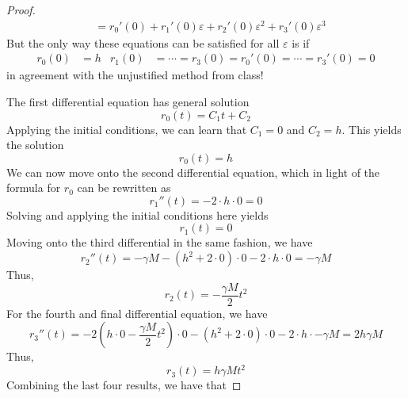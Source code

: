 \documentclass[../notes.tex]{subfiles}
\begin{document}
\begin{enumerate}[label={\textbf{1.\arabic*.}},ref={1.\arabic*},leftmargin=3.5em]
\begin{proof}
\begin{align*}
                &= r_0'(0)+r_1'(0)\varepsilon+r_2'(0)\varepsilon^2+r_3'(0)\varepsilon^3
        \end{align*}
        But the only way these equations can be satisfied for all $\varepsilon$ is if
        \begin{align*}
            r_0(0) &= h&
            r_1(0) &= \cdots = r_3(0) = r_0'(0) = \cdots = r_3'(0) = 0
        \end{align*}
        in agreement with the unjustified method from class!\par
        The first differential equation has general solution
        \begin{equation*}
            r_0(t) = C_1t+C_2
        \end{equation*}
        Applying the initial conditions, we can learn that $C_1=0$ and $C_2=h$. This yields the solution
        \begin{equation*}
            r_0(t) = h
        \end{equation*}
        We can now move onto the second differential equation, which in light of the formula for $r_0$ can be rewritten as
        \begin{equation*}
            r_1''(t) = -2\cdot h\cdot 0 = 0
        \end{equation*}
        Solving and applying the initial conditions here yields
        \begin{equation*}
            r_1(t) = 0
        \end{equation*}
        Moving onto the third differential in the same fashion, we have
        \begin{equation*}
            r_2''(t) = -\gamma M-(h^2+2\cdot 0)\cdot 0-2\cdot h\cdot 0 = -\gamma M
        \end{equation*}
        Thus,
        \begin{equation*}
            r_2(t) = -\frac{\gamma M}{2}t^2
        \end{equation*}
        For the fourth and final differential equation, we have
        \begin{equation*}
            r_3''(t) = -2\left( h\cdot 0-\frac{\gamma M}{2}t^2 \right)\cdot 0-(h^2+2\cdot 0)\cdot 0-2\cdot h\cdot -\gamma M
            = 2h\gamma M
        \end{equation*}
        Thus,
        \begin{equation*}
            r_3(t) = h\gamma Mt^2
        \end{equation*}
        Combining the last four results, we have that

\end{proof}
\end{enumerate}
\end{document}
